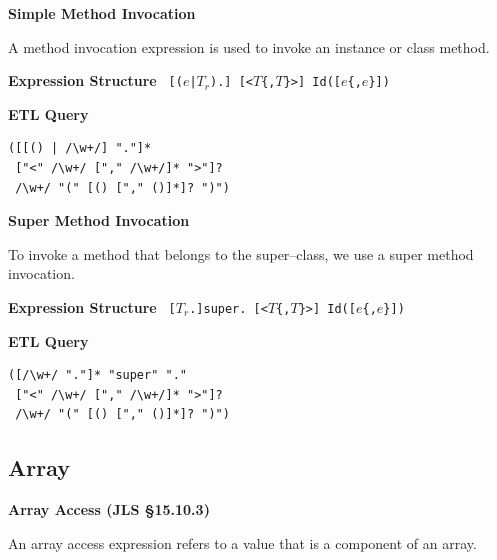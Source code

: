 \begin{chapterBody}
\noindent\textbf{Simple Method Invocation}

A method invocation expression is used to invoke an instance or class method.
\vspace{1em}

\begin{minipage}[t]{.45\linewidth}
\textbf{Expression Structure} \hfill\break
\texttt{
[($e$|$T_r$).]
\hfill\break\hspace*{0.25em}
[{\color{bp-blue}<}$T$\{,$T$\}{\color{bp-blue}>}]
\hfill\break\hspace*{0.25em}
Id{\color{bp-blue}(}[$e$\{,$e$\}]{\color{bp-blue})}
}
\end{minipage}
\begin{minipage}[t]{.45\linewidth}
\textbf{ETL Query}
\begin{lstlisting}[language=etl]
([[() | /\w+/] "."]*
 ["<" /\w+/ ["," /\w+/]* ">"]?
 /\w+/ "(" [() ["," ()]*]? ")")
\end{lstlisting}
\end{minipage}

\noindent\textbf{Super Method Invocation}

To invoke a method that belongs to the super–class, we use a super method
invocation.
\vspace{1em}

\begin{minipage}[t]{.45\linewidth}
\textbf{Expression Structure} \hfill\break
\texttt{
[$T_r$.]{\color{bp-blue}super}.
\hfill\break\hspace*{0.25em}
[{\color{bp-blue}<}$T$\{,$T$\}{\color{bp-blue}>}]
\hfill\break\hspace*{0.25em}
Id{\color{bp-blue}(}[$e$\{,$e$\}]{\color{bp-blue})}
}
\end{minipage}
\begin{minipage}[t]{.45\linewidth}
\textbf{ETL Query}
\begin{lstlisting}[language=etl]
([/\w+/ "."]* "super" "."
 ["<" /\w+/ ["," /\w+/]* ">"]?
 /\w+/ "(" [() ["," ()]*]? ")")
\end{lstlisting}
\end{minipage}

\subsection*{Array}

\noindent\textbf{Array Access (JLS \S15.10.3)}

An array access expression refers to a value that is a component of an array.
\vspace{1em}


\end{chapterBody}
